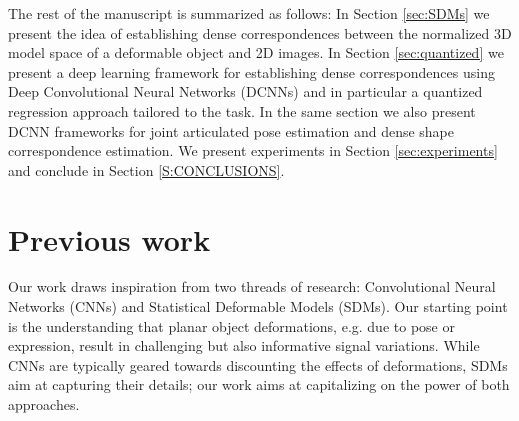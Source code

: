 
The rest of the manuscript is summarized as follows: In Section \ref{sec:SDMs} we present the idea of establishing dense correspondences between the normalized 3D model space of a deformable object and 2D images. In Section \ref{sec:quantized} we present a deep learning framework for establishing dense correspondences using Deep Convolutional Neural Networks (DCNNs) and in particular a quantized regression approach tailored to the task. In the same section we also present DCNN frameworks for joint articulated pose estimation and dense shape correspondence estimation. We present experiments in Section \ref{sec:experiments} and conclude in Section \ref{S:CONCLUSIONS}.

    
    
\section{Previous work}

Our work draws inspiration from two threads of research:  Convolutional Neural Networks (CNNs) and Statistical Deformable Models (SDMs).
Our starting point is the understanding that 
planar object deformations, e.g. due to pose or expression, result in challenging but also informative signal variations. While CNNs are typically geared towards discounting
the effects of deformations,  SDMs aim at capturing their details; our work aims
at capitalizing on the power of both approaches.


